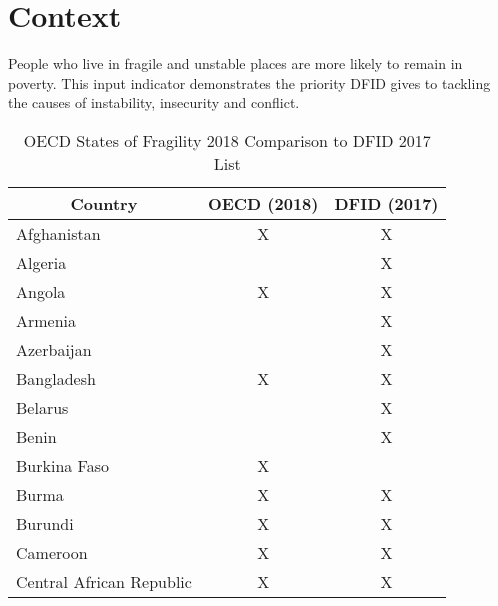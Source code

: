 \section{Context}
People who live in fragile and unstable places are more likely to remain in poverty. %
This input indicator demonstrates the priority DFID gives to tackling the causes of instability, insecurity and conflict. %

\begin{table}[htbp]
	\centering
	\caption{OECD States of Fragility 2018 Comparison to DFID 2017 List}\label{tab:fcas_fragstates}
		\scriptsize
	\begin{tabular}{lcc}
		\toprule
		\multicolumn{1}{c}{\textbf{Country}}         & \textbf{OECD} (2018)               & \textbf{DFID} (2017)               \\ \hline
		\rule{0pt}{7pt}Afghanistan                             & \cellcolor[HTML]{E2EFD9}X & \cellcolor[HTML]{E2EFD9}X \\
		Algeria                                 &                           & \cellcolor[HTML]{FBE4D5}X \\
		Angola                                  & \cellcolor[HTML]{E2EFD9}X & \cellcolor[HTML]{E2EFD9}X \\
		Armenia                                 &                           & \cellcolor[HTML]{FBE4D5}X \\
		Azerbaijan                              &                           & \cellcolor[HTML]{FBE4D5}X \\
		Bangladesh                              & \cellcolor[HTML]{E2EFD9}X & \cellcolor[HTML]{E2EFD9}X \\
		Belarus                                 &                           & \cellcolor[HTML]{FBE4D5}X \\
		Benin                                   &                           & \cellcolor[HTML]{FBE4D5}X \\
		Burkina   Faso                          & \cellcolor[HTML]{FFF2CC}X &                           \\
		Burma                                   & \cellcolor[HTML]{E2EFD9}X & \cellcolor[HTML]{E2EFD9}X \\
		Burundi                                 & \cellcolor[HTML]{E2EFD9}X & \cellcolor[HTML]{E2EFD9}X \\
		Cameroon                                & \cellcolor[HTML]{E2EFD9}X & \cellcolor[HTML]{E2EFD9}X \\
		Central   African Republic              & \cellcolor[HTML]{E2EFD9}X & \cellcolor[HTML]{E2EFD9}X \\

\end{tabular}
\end{table}
